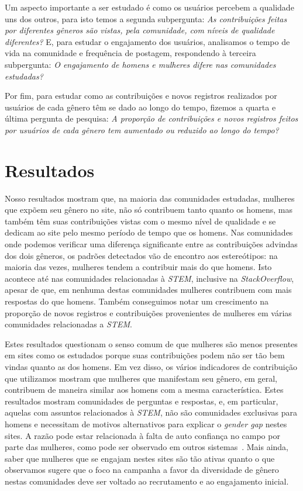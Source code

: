 Um aspecto importante a ser estudado é como os usuários percebem a qualidade uns dos outros, para isto temos a segunda subpergunta: \textit{As contribuições feitas por diferentes gêneros são vistas, pela comunidade, com níveis de qualidade diferentes?} E, para estudar o engajamento dos usuários, analisamos o tempo de vida na comunidade e frequência de postagem, respondendo à terceira subpergunta: \textit{O engajamento de homens e mulheres difere nas comunidades estudadas?}

Por fim, para estudar como as contribuições e novos registros realizados por usuários de cada gênero têm se dado ao longo do tempo, fizemos a quarta e última pergunta de pesquisa: \textit{A proporção de contribuições e novos registros feitos por usuários de cada gênero tem aumentado ou reduzido ao longo do tempo?}


\section{Resultados}

Nosso resultados mostram que, na maioria das comunidades estudadas, mulheres que expõem seu gênero no site, não só contribuem tanto quanto os homens, mas também têm suas contribuições vistas com o mesmo nível de qualidade e se dedicam ao site pelo mesmo período de tempo que os homens. Nas comunidades onde podemos verificar uma diferença significante entre as contribuições advindas dos dois gêneros, os padrões detectados vão de encontro aos estereótipos: na maioria das vezes, mulheres tendem a contribuir mais do que homens. Isto acontece até nas comunidades relacionadas à \emph{STEM}, inclusive na \emph{StackOverflow}, apesar de que, em nenhuma destas comunidades mulheres contribuem com mais respostas do que homens. Também conseguimos notar um crescimento na proporção de novos registros e contribuições provenientes de mulheres em várias comunidades relacionadas a \emph{STEM}.

Estes resultados questionam o senso comum de que mulheres são menos presentes em sites como os estudados porque suas contribuições podem não ser tão bem vindas quanto as dos homens. Em vez disso, os vários indicadores de contribuição que utilizamos mostram que mulheres que manifestam seu gênero, em geral, contribuem de maneira similar aos homens com a mesma característica. Estes resultados mostram comunidades de perguntas e respostas, e, em particular, aquelas com assuntos relacionados à \emph{STEM}, não são comunidades exclusivas para homens e necessitam de motivos alternativos para explicar o \textit{gender gap} nestes sites. A razão pode estar relacionada à falta de auto confiança no campo por parte das mulheres, como pode ser observado em outros sistemas~\cite{piazza:report}. Mais ainda, saber que mulheres que se engajam nestes sites são tão ativas quanto o que observamos sugere que o foco na campanha a favor da diversidade de gênero nestas comunidades deve ser voltado ao recrutamento e ao engajamento inicial.


